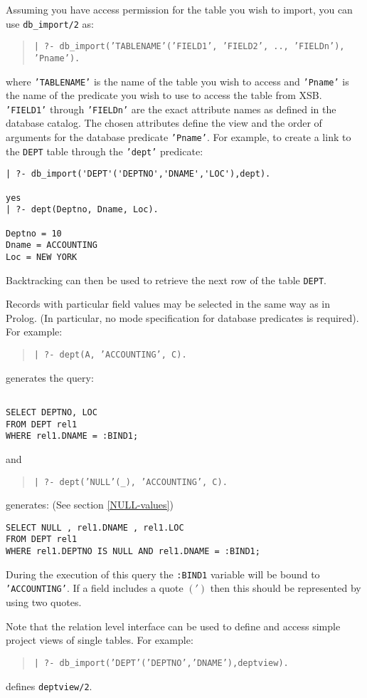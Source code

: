 Assuming you have access permission for the table you wish to import,
you can use {\tt db\_import/2} as:
\begin{quote}
{\tt | ?- db\_import('TABLENAME'('FIELD1', 'FIELD2', .., 'FIELDn'), 'Pname').}
\end{quote}
where {\tt 'TABLENAME'} is the name of the table you wish to access
and {\tt 'Pname'} is the name of the predicate you wish to use to
access the table from XSB. {\tt 'FIELD1'} through {\tt 'FIELDn'} are
the exact attribute names as defined in the database catalog.  The
chosen attributes define the view and the order of arguments for the
database predicate {\tt 'Pname'}.  For example, to create a link to
the {\tt DEPT} table through the {\tt 'dept'} predicate:
\begin{verbatim}
| ?- db_import('DEPT'('DEPTNO','DNAME','LOC'),dept).

yes
| ?- dept(Deptno, Dname, Loc).

Deptno = 10
Dname = ACCOUNTING
Loc = NEW YORK 
\end{verbatim}

Backtracking can then be used to retrieve the next row of the table {\tt DEPT}.

Records with particular field values may be selected in the same way
as in Prolog.  (In particular, no mode specification for database predicates is
required). For example:
\begin{quote}

{\tt | ?- dept(A, 'ACCOUNTING', C).}
\end{quote}
generates the query:
\begin{verbatim}

SELECT DEPTNO, LOC
FROM DEPT rel1
WHERE rel1.DNAME = :BIND1;
\end{verbatim}
and 
\begin{quote}

{\tt | ?- dept('NULL'(\_), 'ACCOUNTING', C).}
\end{quote}
generates: (See section \ref{NULL-values})
\begin{verbatim}
SELECT NULL , rel1.DNAME , rel1.LOC
FROM DEPT rel1
WHERE rel1.DEPTNO IS NULL AND rel1.DNAME = :BIND1;
\end{verbatim}
During the execution of this query the {\tt :BIND1} variable will be bound
to {\tt 'ACCOUNTING'}.\newline
If a field includes a quote $(')$ then this should be represented by
using two quotes.

Note that the relation level interface can be used to define and
access simple project views of single tables.  For example:
\begin{quote}

{\tt | ?- db\_import('DEPT'('DEPTNO','DNAME'),deptview).}
\end{quote}
defines {\tt deptview/2}.

